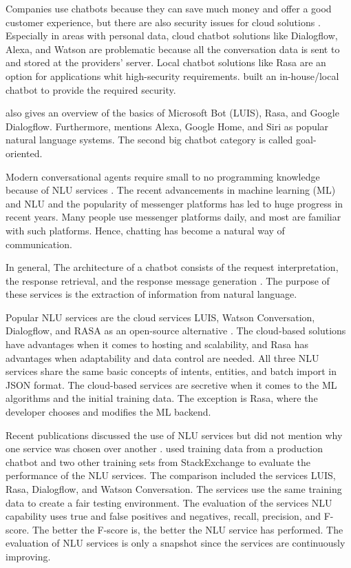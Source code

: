 Companies use chatbots because they can save much money and offer a good customer experience, but there are also security issues for cloud solutions \cite{singhbuilding}.
Especially in areas with personal data, cloud chatbot solutions like Dialogflow, Alexa, and Watson are problematic because all the conversation data is sent to and stored at the providers' server.
Local chatbot solutions like Rasa are an option for applications whit high-security requirements.
\citet{singhbuilding} built an in-house/local chatbot to provide the required security.

\citet{singhbuilding} also gives an overview of the basics of Microsoft Bot (LUIS), Rasa, and Google Dialogflow.
Furthermore, \citet{singhbuilding} mentions Alexa, Google Home, and Siri as popular natural language systems. 
The second big chatbot category is called goal-oriented.


Modern conversational agents require small to no programming knowledge because of NLU services \cite{braunEvaluatingNLU}. 
The recent advancements in machine learning (ML) and NLU and the popularity of messenger platforms has led to huge progress in recent years. 
Many people use messenger platforms daily, and most are familiar with such platforms.
Hence, chatting has become a natural way of communication.

In general, The architecture of a chatbot consists of the request interpretation, the response retrieval, and the response message generation \cite{braunEvaluatingNLU}.
The purpose of these services is the extraction of information from natural language. 

Popular NLU services are the cloud services LUIS, Watson Conversation, Dialogflow, and RASA as an open-source alternative \cite{braunEvaluatingNLU}. 
The cloud-based solutions have advantages when it comes to hosting and scalability, and Rasa has advantages when adaptability and data control are needed. 
All three NLU services share the same basic concepts of intents, entities, and batch import in JSON format.
The cloud-based services are secretive when it comes to the ML algorithms and the initial training data. 
The exception is Rasa, where the developer chooses and modifies the ML backend. 

Recent publications discussed the use of NLU services but did not mention why one service was chosen over another \cite{braunEvaluatingNLU}.
\citet{braunEvaluatingNLU} used training data from a production chatbot and two other training sets from StackExchange to evaluate the performance of the NLU services.
The comparison included the services LUIS, Rasa, Dialogflow, and Watson Conversation.
The services use the same training data to create a fair testing environment. 
The evaluation of the services NLU capability uses true and false positives and negatives, recall, precision, and F-score. 
The better the F-score is, the better the NLU service has performed. 
The evaluation of NLU services is only a snapshot since the services are continuously improving. 

